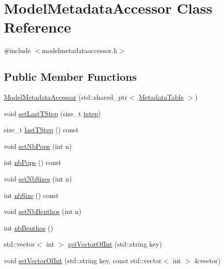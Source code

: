 \hypertarget{class_model_metadata_accessor}{}\section{Model\+Metadata\+Accessor Class Reference}
\label{class_model_metadata_accessor}


{\ttfamily \#include $<$modelmetadataaccessor.\+h$>$}

\subsection*{Public Member Functions}
\begin{DoxyCompactItemize}
\item 
\mbox{\hyperlink{class_model_metadata_accessor_aef28021573404fe611f1e272d6b9e353}{Model\+Metadata\+Accessor}} (std\+::shared\+\_\+ptr$<$ \mbox{\hyperlink{class_metadata_table}{Metadata\+Table}} $>$)
\item 
void \mbox{\hyperlink{class_model_metadata_accessor_a53ed4e81a78c4b582271ae68a70fc1b8}{set\+Last\+T\+Step}} (size\+\_\+t \mbox{\hyperlink{thread__vessels_8cpp_a84bc73d278de929ec9974e1a95d9b23a}{tstep}})
\item 
size\+\_\+t \mbox{\hyperlink{class_model_metadata_accessor_a6fd4982675afd2b57c4ec2db9f33ef34}{last\+T\+Step}} () const
\item 
void \mbox{\hyperlink{class_model_metadata_accessor_ae474189330eab5f54291fe2270bace2c}{set\+Nb\+Pops}} (int n)
\item 
int \mbox{\hyperlink{class_model_metadata_accessor_a53a1e115b853064615fe94698dcb3156}{nb\+Pops}} () const
\item 
void \mbox{\hyperlink{class_model_metadata_accessor_ac63fa32ffc924a8a16249da139ef77cb}{set\+Nb\+Sizes}} (int n)
\item 
int \mbox{\hyperlink{class_model_metadata_accessor_a9fd8fcaef777133aacc006676126ad38}{nb\+Size}} () const
\item 
void \mbox{\hyperlink{class_model_metadata_accessor_ac25b8569a0a0530ac3acca703d30860c}{set\+Nb\+Benthos}} (int n)
\item 
int \mbox{\hyperlink{class_model_metadata_accessor_a4a2113bbc8026096bb6060450e8c4f08}{nb\+Benthos}} ()
\item 
std\+::vector$<$ int $>$ \mbox{\hyperlink{class_model_metadata_accessor_a319af96e7b2076881ebf7276f71d447c}{get\+Vector\+Of\+Int}} (std\+::string key)
\item 
void \mbox{\hyperlink{class_model_metadata_accessor_acd778eacdad772a4d7bf5d203ea5a99c}{set\+Vector\+Of\+Int}} (std\+::string key, const std\+::vector$<$ int $>$ \&vector)
\end{DoxyCompactItemize}


